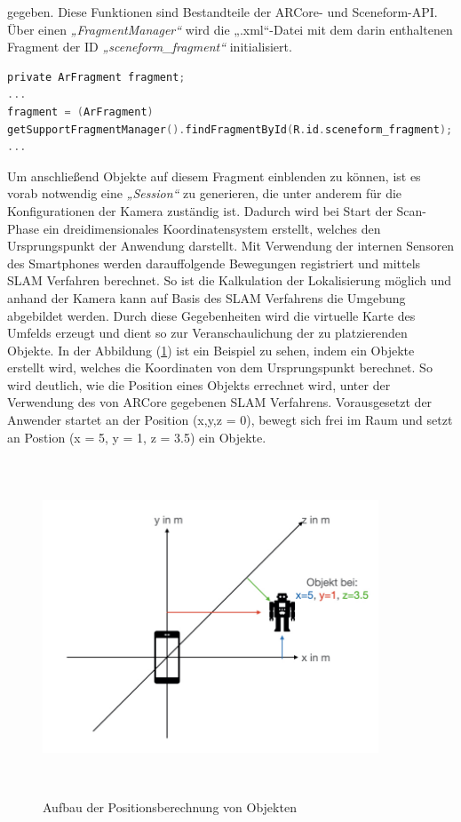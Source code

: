 gegeben. Diese Funktionen sind Bestandteile der ARCore- und Sceneform-\acs{API}. Über einen \textit{„FragmentManager“} wird die „.xml“-Datei mit dem darin 
enthaltenen Fragment der ID \textit{„sceneform\_fragment“} initialisiert.
\\
\begin{lstlisting}[language=C,
    frame=lines,           % Ein Rahmen um den Code (single for box, lines for top and bottom)
    xleftmargin=\parindent,  % Rahmen link von den Zahlen
    style=algoBericht,
    label={code:arfragment},
    captionpos=b,           % Caption unter den Code setzen
caption={Initialisierung des Fragments}]
private ArFragment fragment;
...
fragment = (ArFragment)
getSupportFragmentManager().findFragmentById(R.id.sceneform_fragment);
...
\end{lstlisting}
Um anschließend Objekte auf diesem Fragment einblenden zu können, ist es vorab notwendig eine \textit{„Session“} zu generieren, die unter anderem für die 
Konfigurationen der Kamera zuständig ist. Dadurch wird bei Start der Scan-Phase ein dreidimensionales Koordinatensystem erstellt, welches den Ursprungspunkt der 
Anwendung darstellt. Mit Verwendung der internen Sensoren des Smartphones werden darauffolgende Bewegungen registriert und mittels \acs{SLAM} Verfahren berechnet. 
So ist die Kalkulation der Lokalisierung möglich und anhand der Kamera kann auf Basis des \acs{SLAM} Verfahrens die Umgebung abgebildet werden. Durch diese 
Gegebenheiten wird die virtuelle Karte des Umfelds erzeugt und dient so zur Veranschaulichung der zu platzierenden Objekte. In der Abbildung (\ref{pic:koordin}) 
ist ein Beispiel zu sehen, indem ein Objekte erstellt wird, welches die Koordinaten von dem Ursprungspunkt berechnet. So wird deutlich, wie die Position eines 
Objekts errechnet wird, unter der Verwendung des von ARCore gegebenen \acs{SLAM} Verfahrens. Vorausgesetzt der Anwender startet an der Position (x,y,z = 0), 
bewegt sich frei im Raum und setzt an Postion (x = 5, y = 1, z = 3.5) ein Objekte.
\begin{figure}[hbt!]
    \centering
    \includegraphics[width=10cm,height=10cm,keepaspectratio]{4Umsetzung/Bilder/koordin.jpeg}
    \caption{Aufbau der Positionsberechnung von Objekten}
    \label{pic:koordin}
\end{figure}
